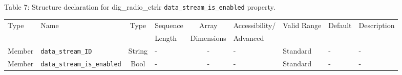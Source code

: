 \documentclass{article}
\def\comp{dig\_radio\_ctrlr}
\begin{document}
\begin{landscape}
	\noindent Table \hypertarget{tab7}{7}: Structure declaration for \comp{} \verb+data_stream_is_enabled+ property.
	\begin{scriptsize}
		\noindent\begin{longtable}{|p{1.8cm}|p{3.6cm}|c|p{4cm}|c|p{2cm}|p{1.7cm}|p{0.8cm}|p{4.81cm}|}
			\hline
			\rowcolor{blue}
			Type         & Name                                & Type & Sequence & Array      & Accessibility/ & Valid Range  & Default & Description                                                                                                                                                                                                                       \\
			\rowcolor{blue}
			             &                                     &      & Length   & Dimensions & Advanced       &              &         &                                                                                                                                                                                                                             \\
			\hline
			Member       & \verb+data_stream_ID+               & String& -       & -          & -              & Standard     & -       & - \\
			\hline
			Member       & \verb+data_stream_is_enabled+       & Bool& -       & -          & -              & Standard & -       & - \\
			\hline
		\end{longtable}
	\end{scriptsize}


\end{landscape}
\end{document}
